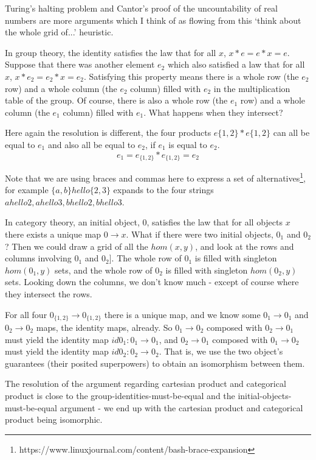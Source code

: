 \documentclass{proc-l}
\theoremstyle{definition}
\theoremstyle{remark}
\numberwithin{equation}{section}
\begin{document}
Turing's halting problem and Cantor's proof of the uncountability of real numbers are
more arguments which I think of as flowing from this `think about the whole grid of...'
heuristic.

In group theory, the identity satisfies the law that for all \(x\), \(x * e = e * x = e\).
Suppose that there was another element \(e_2\) which also satisfied a law that for all \(x\), \(x * e_2 = e_2 * x = e_2\).
Satisfying this property means there is a whole row (the \(e_2\) row) and a whole column (the \(e_2\) column) filled with \(e_2\) in the multiplication table of the group.
Of course, there is also a whole row (the \(e_1\) row) and a whole column (the \(e_1\) column) filled with \(e_1\).
What happens when they intersect?

Here again the resolution is different, the four products \(e\{1,2\} * e\{1,2\}\) can all be equal to \(e_1\) and also all be equal to \(e_2\), if \(e_1\) is equal to \(e_2\).
\[
e_1 = e_{\{1,2\}} * e_{\{1,2\}} = e_2
\]

Note that we are using braces and commas here to express a set of alternatives\footnote{https://www.linuxjournal.com/content/bash-brace-expansion}, for example \(\{a,b\} hello \{2,3\}\) expands to the four strings \(a hello 2, a hello 3, b hello 2, b hello 3\).

In category theory, an initial object, 0,  satisfies the law that for all objects \(x\) there exists a unique map \(0 \to x\). What if there were two initial objects, \(0_1\) and \(0_2\)?
Then we could draw a grid of all the \(hom(x, y)\), and look at the rows and columns involving \(0_1\) and \(0_2]\).
The whole row of \(0_1\) is filled with singleton \(hom(0_1, y)\) sets,
and the whole row of \(0_2\) is filled with singleton \(hom(0_2, y)\) sets.
Looking down the columns, we don't know much - except of course where they intersect the rows.

For all four \(0_{\{1,2\}} \to 0_{\{1,2\}}\) there is a unique map,
and we know some \(0_1\to0_1\) and \(0_2\to0_2\) maps, the identity maps, already.
So \(0_1\to 0_2\) composed with \(0_2 \to 0_1\) must yield the identity map \(id 0_1 : 0_1 \to 0_1\),
and \(0_2 \to 0_1\) composed with \(0_1 \to 0_2\) must yield the identity map \(id 0_2 : 0_2 \to 0_2\).
That is, we use the two object's guarantees (their posited superpowers) to obtain an isomorphism between them.

The resolution of the argument regarding cartesian product and categorical product is close to the group-identities-must-be-equal and the initial-objects-must-be-equal
argument - we end up with the cartesian product and categorical product being isomorphic.
\end{document}
